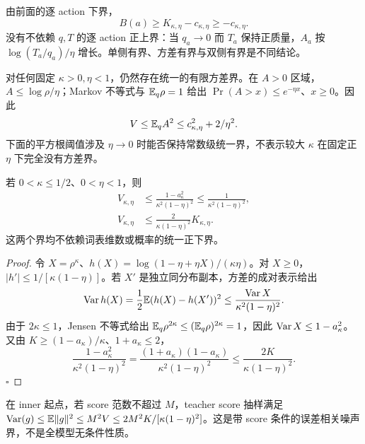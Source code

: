 由前面的逐 action 下界，
\begin{equation}
 B(a)\ge K_{\kappa,\eta}-c_{\kappa,\eta}\ge-c_{\kappa,\eta}.
\end{equation}
没有不依赖 $q,T$ 的逐 action 正上界：当 $q_a\to0$ 而 $T_a$ 保持正质量，$A_a$ 按 $\log(T_a/q_a)/\eta$ 增长。单侧有界、方差有界与双侧有界是不同结论。

对任何固定 $\kappa>0,\eta<1$，仍然存在统一的有限方差界。在 $A>0$ 区域，$A\le\log\rho/\eta$；Markov 不等式与 $\mathbb E_q\rho=1$ 给出 $\Pr(A>x)\le e^{-\eta x}$、$x\ge0$。因此
\begin{equation}
 V\le\mathbb E_qA^2\le c_{\kappa,\eta}^2+2/\eta^2.
\end{equation}
下面的平方根阈值涉及 $\eta\to0$ 时能否保持常数级统一界，不表示较大 $\kappa$ 在固定正 $\eta$ 下完全没有方差界。

\begin{theorem}
\label{thm:center-advantage-variance}
若 $0<\kappa\le1/2$、$0<\eta<1$，则
\begin{align}
 V_{\kappa,\eta}
 &\le\frac{1-a_\kappa^2}{\kappa^2(1-\eta)^2}
 \le\frac1{\kappa^2(1-\eta)^2},\\
 V_{\kappa,\eta}
 &\le\frac{2}{\kappa(1-\eta)^2}K_{\kappa,\eta}.
 \label{eq:center-error-scaled-variance}
\end{align}
这两个界均不依赖词表维数或概率的统一正下界。
\end{theorem}

\begin{proof}
令 $X=\rho^\kappa$、$h(X)=\log(1-\eta+\eta X)/(\kappa\eta)$。对 $X\ge0$，$|h'|\le1/[\kappa(1-\eta)]$。若 $X'$ 是独立同分布副本，方差的成对表示给出
\begin{equation}
 \operatorname{Var} h(X)=\frac12\mathbb E(h(X)-h(X'))^2
 \le\frac{\operatorname{Var} X}{\kappa^2(1-\eta)^2}.
\end{equation}
由于 $2\kappa\le1$，Jensen 不等式给出 $\mathbb E_q\rho^{2\kappa}\le(\mathbb E_q\rho)^{2\kappa}=1$，因此 $\operatorname{Var} X\le1-a_\kappa^2$。又由 $K\ge(1-a_\kappa)/\kappa$、$1+a_\kappa\le2$，
\begin{equation}
 \frac{1-a_\kappa^2}{\kappa^2(1-\eta)^2}
 =\frac{(1+a_\kappa)(1-a_\kappa)}{\kappa^2(1-\eta)^2}
 \le\frac{2K}{\kappa(1-\eta)^2}.
\end{equation}
\hfill$\square$
\end{proof}

在 inner 起点，若 score 范数不超过 $M$，teacher score 抽样满足 $\operatorname{Var}(g)\le\mathbb E\|g\|^2\le M^2V\le2M^2K/[\kappa(1-\eta)^2]$。这是带 score 条件的误差相关噪声界，不是全模型无条件性质。

